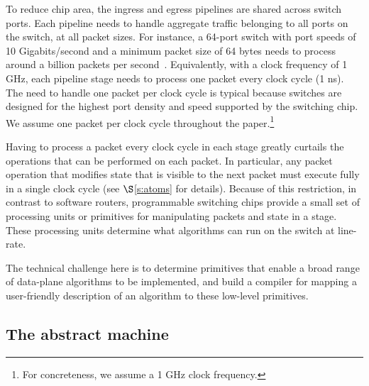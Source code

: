 To reduce chip area, the ingress and egress pipelines are shared
across switch ports.  Each pipeline needs to handle aggregate traffic
belonging to all ports on the switch, at all packet sizes.  For
instance, a 64-port switch with port speeds of 10 Gigabits/second and
a minimum packet size of 64 bytes needs to process around a billion
packets per second~\cite{rmt}.  Equivalently, with a clock frequency
of 1 GHz, each pipeline stage needs to process one packet every clock
cycle (1 ns).  The need to handle one packet per clock cycle is
typical because switches are designed for the highest port density and
speed supported by the switching chip. We assume one packet per clock
cycle throughout the paper.\footnote{For concreteness, we assume a 1
  GHz clock frequency.}

Having to process a packet every clock cycle in each stage greatly
curtails the operations that can be performed on each packet. In
particular, any packet operation that modifies state that is visible
to the next packet must execute fully in a single clock cycle (see
$\S$\ref{s:atoms} for details). Because of this restriction, in
contrast to software routers, programmable switching chips provide a
small set of processing units or primitives for manipulating packets
and state in a stage. These processing units determine what algorithms
can run on the switch at line-rate. 

The technical challenge here is to determine primitives that enable a
broad range of data-plane algorithms to be implemented, and build a
compiler for mapping a user-friendly description of an algorithm to
these low-level primitives.



\subsection{The \absmachine abstract machine}

